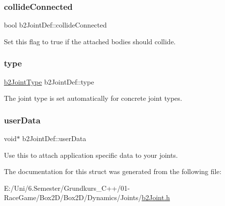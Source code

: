 \subsubsection{\texorpdfstring{collideConnected}{collideConnected}}
{\footnotesize\ttfamily bool b2\+Joint\+Def\+::collide\+Connected}



Set this flag to true if the attached bodies should collide. 

\mbox{\label{structb2_joint_def_a470f2879b24adb05facbd49f338856fb}} 
\subsubsection{\texorpdfstring{type}{type}}
{\footnotesize\ttfamily \mbox{\hyperlink{b2_joint_8h_a0bb202d8a286c888a11985b07b2272ab}{b2\+Joint\+Type}} b2\+Joint\+Def\+::type}



The joint type is set automatically for concrete joint types. 

\mbox{\label{structb2_joint_def_a07eb150daaaa52fc09c3bcf402b295fe}} 
\subsubsection{\texorpdfstring{userData}{userData}}
{\footnotesize\ttfamily void$\ast$ b2\+Joint\+Def\+::user\+Data}



Use this to attach application specific data to your joints. 



The documentation for this struct was generated from the following file\+:\begin{DoxyCompactItemize}
\item 
E\+:/\+Uni/6.\+Semester/\+Grundkurs\+\_\+\+C++/01-\/\+Race\+Game/\+Box2\+D/\+Box2\+D/\+Dynamics/\+Joints/\mbox{\hyperlink{b2_joint_8h}{b2\+Joint.\+h}}\end{DoxyCompactItemize}
